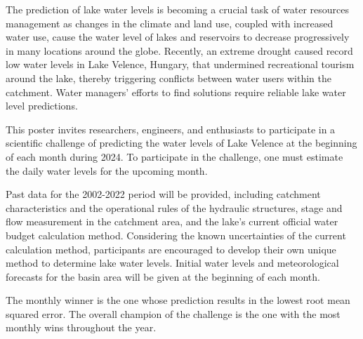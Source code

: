 \noindent

The prediction of lake water levels is becoming a crucial task of water resources management as changes in the climate and land use, coupled with increased water use, cause the water level of lakes and reservoirs to decrease progressively in many locations around the globe. Recently, an extreme drought caused record low water levels in Lake Velence, Hungary, that undermined recreational tourism around the lake, thereby triggering conflicts between water users within the catchment. Water managers' efforts to find solutions require reliable lake water level predictions.

This poster invites researchers, engineers, and enthusiasts to participate in a scientific challenge of predicting the water levels of Lake Velence at the beginning of each month during 2024. To participate in the challenge, one must estimate the daily water levels for the upcoming month. 

Past data for the 2002-2022 period will be provided, including catchment characteristics and the operational rules of the hydraulic structures, stage and flow measurement in the catchment area, and the lake's current official water budget calculation method. Considering the known uncertainties of the current calculation method, participants are encouraged to develop their own unique method to determine lake water levels. Initial water levels and meteorological forecasts for the basin area will be given at the beginning of each month. 

The monthly winner is the one whose prediction results in the lowest root mean squared error. The overall champion of the challenge is the one with the most monthly wins throughout the year.

